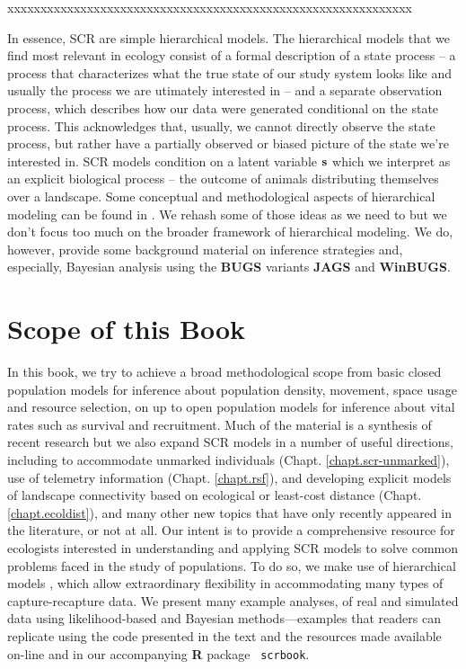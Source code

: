 xxxxxxxxxxxxxxxxxxxxxxxxxxxxxxxxxxxxxxxxxxxxxxxxxxxxxxxxxxxxx

In essence, SCR are
simple hierarchical models.  %
The hierarchical models that we find most relevant in ecology %
consist of a formal description of a state process -- a process that
characterizes what the true state of our study system looks like and
usually the process we are utimately interested in -- and a separate
observation process, which describes how our data were generated
conditional on the state process. This acknowledges that, usually, we
cannot directly observe the state process, but rather have a partially
observed or biased picture of the state we're interested in.  SCR
models condition on a latent variable ${\bf s}$ which we interpret as
an explicit biological process -- the outcome of animals distributing
themselves over a landscape.  Some conceptual and methodological
aspects of hierarchical modeling can be found in
\citet{royle_dorazio:2008}. We rehash some of those ideas as we need
to but we don't focus too much on the broader framework of
hierarchical modeling.  We do, however, provide some background
material on inference strategies and, especially, Bayesian analysis
using the {\bf BUGS} variants {\bf JAGS} and {\bf WinBUGS}.




\section{Scope of this Book}

In this book, we try to achieve a broad methodological scope from
basic closed population models for inference about population density,
movement, space usage and resource selection, on up to open population
models for inference about vital rates such as survival and
recruitment.  Much of the material is a synthesis of recent research
but we also expand SCR models in a number of useful directions,
including to accommodate unmarked individuals
(Chapt. \ref{chapt.scr-unmarked}), use of telemetry information
(Chapt. \ref{chapt.rsf}), and developing explicit models of landscape
connectivity based on ecological or least-cost distance
(Chapt. \ref{chapt.ecoldist}), and many other new topics that have
only recently appeared in the literature, or not at all.  Our intent
is to provide a comprehensive resource for ecologists interested in
understanding and applying SCR models to solve common problems faced
in the study of populations.  To do so, we make use of hierarchical
models \citep{royle_dorazio:2008}, which allow extraordinary
flexibility in accommodating many types of capture-recapture data. We
present many example analyses, of real and simulated data using
likelihood-based and Bayesian methods---examples that readers can
replicate using the code presented in the text and the resources made
available on-line and in our accompanying {\bf R} package {\tt
  scrbook}.

